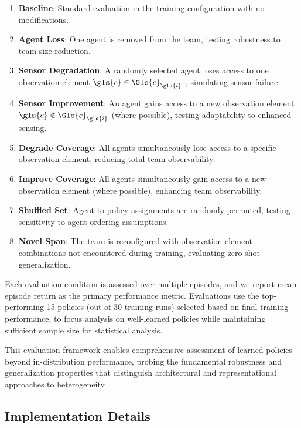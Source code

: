 \documentclass[conference]{IEEEtran}
\begin{document}
\begin{enumerate}
    \item \textbf{Baseline}: 
    Standard evaluation in the training configuration with no modifications.
    \item \textbf{Agent Loss}: 
    One agent is removed from the team, testing robustness to team size reduction.
    \item \textbf{Sensor Degradation}: 
    A randomly selected agent loses access to one observation element 
    \(\gls{c}\in\Gls{c}_{\gls{i}}\) , simulating sensor failure.
    \item \textbf{Sensor Improvement}: 
    An agent gains access to a new observation element \(\gls{c}\notin\Gls{c}_{\gls{i}}\) 
    (where possible), testing adaptability to enhanced sensing.
    \item \textbf{Degrade Coverage}: 
    All agents simultaneously lose access to a specific observation element, 
    reducing total team observability.
    \item \textbf{Improve Coverage}: 
    All agents simultaneously gain access to a 
    new observation element (where possible), enhancing team observability.
    \item \textbf{Shuffled Set}: 
    Agent-to-policy assignments are randomly permuted, testing sensitivity 
    to agent ordering assumptions.
    \item \textbf{Novel Span}: 
    The team is reconfigured with observation-element combinations not 
    encountered during training, evaluating zero-shot generalization.
\end{enumerate}

Each evaluation condition is assessed over multiple episodes, 
and we report mean episode return as the primary performance metric. 
Evaluations use the top-performing 15 policies (out of 30 training runs) 
selected based on final training performance, 
to focus analysis on well-learned policies while maintaining sufficient 
sample size for statistical analysis. 

This evaluation framework enables comprehensive assessment of 
learned policies beyond in-distribution performance, probing the 
fundamental robustness and generalization properties that distinguish 
architectural and representational approaches to heterogeneity.

\subsection{Implementation Details}
\end{document}
